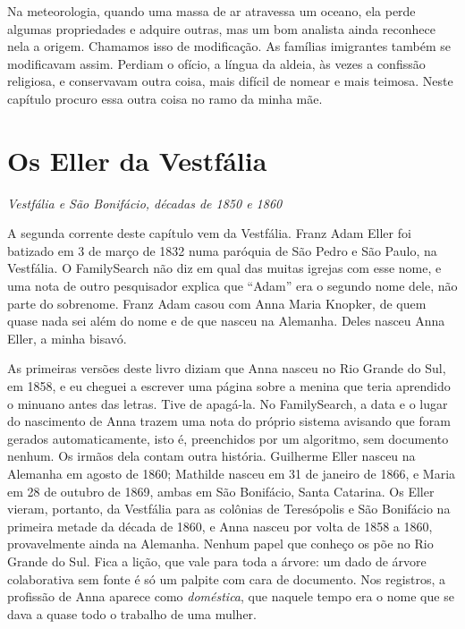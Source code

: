 \documentclass[
  brazilian,
  11pt,
  openany]{book}
\begin{document}
Na meteorologia, quando uma massa de ar atravessa um oceano, ela perde
algumas propriedades e adquire outras, mas um bom analista ainda
reconhece nela a origem. Chamamos isso de modificação. As famílias
imigrantes também se modificavam assim. Perdiam o ofício, a língua da
aldeia, às vezes a confissão religiosa, e conservavam outra coisa, mais
difícil de nomear e mais teimosa. Neste capítulo procuro essa outra
coisa no ramo da minha mãe.

\section{Os Eller da Vestfália}\label{os-eller-da-vestfuxe1lia}

\emph{Vestfália e São Bonifácio, décadas de 1850 e 1860}

A segunda corrente deste capítulo vem da Vestfália. Franz Adam Eller foi
batizado em 3 de março de 1832 numa paróquia de São Pedro e São Paulo,
na Vestfália. O FamilySearch não diz em qual das muitas igrejas com esse
nome, e uma nota de outro pesquisador explica que ``Adam'' era o segundo
nome dele, não parte do sobrenome. Franz Adam casou com Anna Maria
Knopker, de quem quase nada sei além do nome e de que nasceu na
Alemanha. Deles nasceu Anna Eller, a minha bisavó.

As primeiras versões deste livro diziam que Anna nasceu no Rio Grande do
Sul, em 1858, e eu cheguei a escrever uma página sobre a menina que
teria aprendido o minuano antes das letras. Tive de apagá-la. No
FamilySearch, a data e o lugar do nascimento de Anna trazem uma nota do
próprio sistema avisando que foram gerados automaticamente, isto é,
preenchidos por um algoritmo, sem documento nenhum. Os irmãos dela
contam outra história. Guilherme Eller nasceu na Alemanha em agosto de
1860; Mathilde nasceu em 31 de janeiro de 1866, e Maria em 28 de outubro
de 1869, ambas em São Bonifácio, Santa Catarina. Os Eller vieram,
portanto, da Vestfália para as colônias de Teresópolis e São Bonifácio
na primeira metade da década de 1860, e Anna nasceu por volta de 1858 a
1860, provavelmente ainda na Alemanha. Nenhum papel que conheço os põe
no Rio Grande do Sul. Fica a lição, que vale para toda a árvore: um dado
de árvore colaborativa sem fonte é só um palpite com cara de documento.
Nos registros, a profissão de Anna aparece como \emph{doméstica}, que
naquele tempo era o nome que se dava a quase todo o trabalho de uma
mulher.
\end{document}
